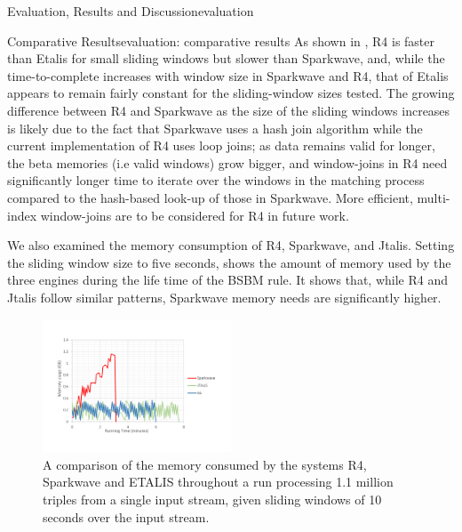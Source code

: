 \begin{nestedsection}{Evaluation, Results and Discussion}{evaluation}
\begin{nestedsection}{Comparative Results}{evaluation: comparative results}
		As shown in , R4 is faster than Etalis for small sliding windows but slower than Sparkwave, and, while the time-to-complete increases with window size in Sparkwave and R4, that of Etalis appears to remain fairly constant for the sliding-window sizes tested.
		The growing difference between R4 and Sparkwave as the size of the sliding windows increases is likely due to the fact that Sparkwave uses a hash join algorithm while the current implementation of R4 uses loop joins;
		as data remains valid for longer, the beta memories (i.e valid windows) grow bigger, and window-joins in R4 need significantly longer time to iterate over the windows in the matching process compared to the hash-based look-up of those in Sparkwave.
		More efficient, multi-index window-joins are to be considered for R4 in future work.

		We also examined the memory consumption of R4, Sparkwave, and Jtalis.
		Setting the sliding window size to five seconds,  shows the amount of memory used by the three engines during the life time of the BSBM rule.
		It shows that, while R4 and Jtalis follow similar patterns, Sparkwave memory needs are significantly higher.
		\begin{figure}
			\centering
			\includegraphics[width=0.5\textwidth]{memoryConsumptionComparison}
			\caption{A comparison of the memory consumed by the systems R4, Sparkwave and ETALIS throughout a run processing 1.1 million triples from a single input stream, given sliding windows of 10 seconds over the input stream.}
		\end{figure}
	\end{nestedsection}

\end{nestedsection}
